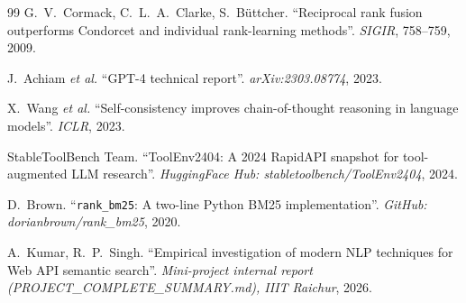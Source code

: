 \documentclass[10pt,a4paper,twocolumn]{article}
\begin{document}
\begin{thebibliography}{99}
G.~V.~Cormack, C.~L.~A.~Clarke, S.~B\"{u}ttcher.
``Reciprocal rank fusion outperforms Condorcet and individual
rank-learning methods''.
\textit{SIGIR}, 758--759, 2009.

J.~Achiam \textit{et al.}
``GPT-4 technical report''.
\textit{arXiv:2303.08774}, 2023.

X.~Wang \textit{et al.}
``Self-consistency improves chain-of-thought reasoning in language
models''.
\textit{ICLR}, 2023.

StableToolBench Team.
``ToolEnv2404: A 2024 RapidAPI snapshot for tool-augmented LLM
research''.
\textit{HuggingFace Hub: stabletoolbench/ToolEnv2404}, 2024.

D.~Brown.
``\texttt{rank\_bm25}: A two-line Python BM25 implementation''.
\textit{GitHub: dorianbrown/rank\_bm25}, 2020.

A.~Kumar, R.~P.~Singh.
``Empirical investigation of modern NLP techniques for Web API
semantic search''.
\textit{Mini-project internal report
(PROJECT\_COMPLETE\_SUMMARY.md), IIIT Raichur}, 2026.

\end{thebibliography}
\end{document}
